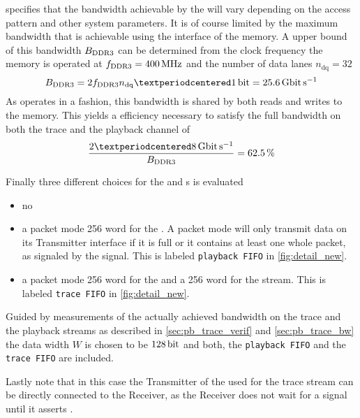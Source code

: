 \Xilinx{} specifies that the bandwidth achievable by the \XilinxMIG{} will vary depending on the access pattern and other system parameters. It is of course limited by the maximum bandwidth that is achievable using the \DDR{} interface of the memory. A upper bound of this bandwidth $B_{\text{DDR3{}}}$ can be determined from the clock frequency the memory is operated at $f_{\text{DDR3{}}} = \SI{400}{\mega\hertz}$ and the number of data lanes $n_{\text{dq}} = \num{32}$
\[B_{\text{\DDR{}}} = 2 f_{\text{\DDR{}}} n_{\text{dq}} · \SI{1}{\bit} = \SI{25.6}{\giga\bit\per\second}\]
As \DDR{} operates in a \halfduplex{} fashion, this bandwidth is shared by both reads and writes to the memory. This yields a efficiency necessary to satisfy the full bandwidth on both the trace and the playback channel of
\[\frac{2 · \pbExecBandwidth{}}{B_{\text{\DDR{}}}} = \SI{62.5}{\percent}\]

Finally three different choices for the \SToMM{} and \MMToS{} \FIFO{}s is evaluated
\begin{itemize}
\item no \FIFO{}
\item a packet mode \num{256} word \FIFO{} for the \MMToS{} \AXIStream{}. A packet mode \FIFO{} will only transmit data on its Transmitter interface if it is full or it contains at least one whole packet, as signaled by the \TLAST{} signal. This \FIFO{} is labeled \texttt{playback FIFO} in \autoref{fig:detail_new}.
\item a packet mode \num{256} word \FIFO{} for the \MMToS{} \AXIStream{} and a \num{256} word \FIFO{} for the \SToMM{} stream. This \FIFO{} is labeled \texttt{trace FIFO} in \autoref{fig:detail_new}.
\end{itemize}

Guided by measurements of the actually achieved bandwidth on the trace and the playback streams as described in \autoref{sec:pb_trace_verif} and \autoref{sec:pb_trace_bw} the data width $W$ is chosen to be $\SI{128}{\bit}$ and both, the \texttt{playback FIFO} and the \texttt{trace FIFO} are included.

Lastly note that in this case the \ValidNextStream{} Transmitter of the \pbexec{} used for the trace stream can be directly connected to the \SToMM{} \AXIStream{} Receiver, as the \SToMM{} \AXIStream{} Receiver does not wait for a \TVALID{} signal until it asserts \TREADY{}.




